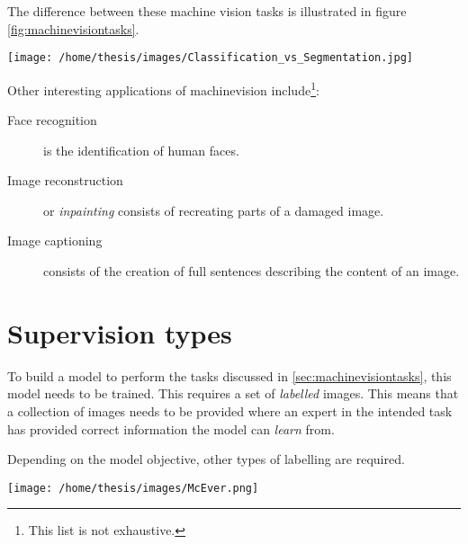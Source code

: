 The difference between these machine vision tasks is illustrated in figure \ref{fig:machinevisiontasks}. 

\begin{SCfigure}[][h!]
    \centering
    \texttt{[image: /home/thesis/images/Classification\_vs\_Segmentation.jpg]}
    \caption{Illustration to compare different Machine vision tasks \cite{SemTorch76:online}. 
    Object detection means that the location of several objects is estimated by the model. This is indicated by the \textit{bounding boxes}.
    Segmentation of an image is the process of classifying each pixel in the correct class or assign it to the \textit{background} class.
    Semantic segmentation makes no difference between different instances of the same semantic class, instance segmentation does.
    \label{fig:machinevisiontasks}}
\end{SCfigure}

Other interesting applications of \gls{machinevision} include\footnote{This list is not exhaustive.}:
\begin{description}
    \item[Face recognition] is the identification of human faces. 
    \item[Image reconstruction] or \textit{inpainting} consists of recreating parts of a damaged image.
    \item[Image captioning] consists of the creation of full sentences describing the content of an image.    
\end{description}

\section{Supervision types}

To build a model to perform the tasks discussed in \ref{sec:machinevisiontasks}, this model needs to be trained.
This requires a set of \textit{labelled} images. 
This means that a collection of images needs to be provided where an expert in the intended task has provided correct information the model can \textit{learn} from.

Depending on the model objective, other types of labelling are required.

\begin{SCfigure}[][htb]
    \centering
    \texttt{[image: /home/thesis/images/McEver.png]}
    \caption{Four different annotation types \cite{McEver2020}: 
    On the top left the picture is point level annotated. The points are inflated for visibility.
    On the top right, squiggle annotation is used.
    The bottom left shows bounding box supervion.
    While the bottom right image is fully annotated.
    An image level label would indicate that there are multiple instances of \textit{person} and \textit{bike} in the image.
    }
\end{SCfigure}

